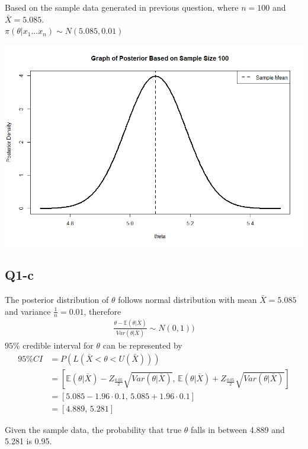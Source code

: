 \documentclass[11pt,letterpaper]{article}
\begin{document}
\noindent Based on the sample data generated in previous question, where $n = 100$ and $\bar{X} = 5.085$. \\
\noindent $\pi(\theta | x_1...x_n) \sim N(5.085, 0.01)$

\includegraphics[width=150mm]{posterior_density.png}

\subsection*{Q1-c}
\noindent The posterior distribution of $\theta$ follows normal distribution with mean $\bar{X} = 5.085$ and variance $\frac{1}{n} = 0.01$, therefore
\begin{align*}
\frac{\theta - \mathbb{E}(\theta | \bar{X})}{Var(\theta | \bar{X})} \sim N(0, 1))
\end{align*}
\noindent $95 \%$ credible interval for $\theta$ can be represented by 
\begin{align*}
95 \% CI &= P(L(\bar{X} < \theta < U(\bar{X}))) \\
&= [\mathbb{E}(\theta | \bar{X}) - Z_{\frac{0.05}{2}} \sqrt{Var(\theta | \bar{X})} \text{,  }  \mathbb{E}(\theta | \bar{X}) + Z_{\frac{0.05}{2}} \sqrt{Var(\theta | \bar{X})} ] \\
&= [5.085 - 1.96 \cdot 0.1 \text{,  } 5.085 + 1.96 \cdot 0.1] \\
&= [4.889 \text{,  } 5.281]
\end{align*}

\noindent Given the sample data, the probability that true $\theta$ falls in between 4.889 and 5.281 is 0.95.
\end{document}
